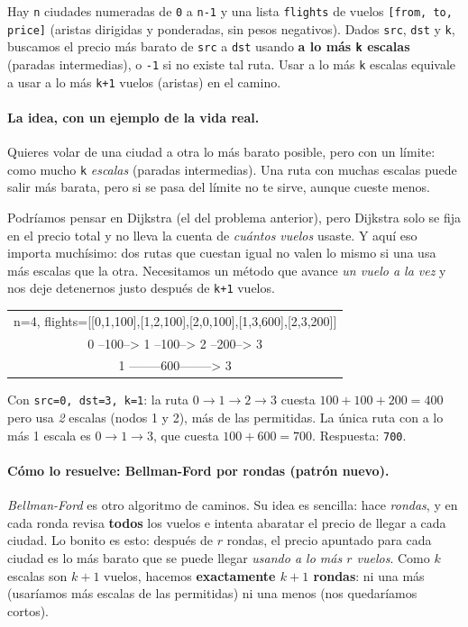 
Hay \texttt{n} ciudades numeradas de \texttt{0} a \texttt{n-1} y una lista
\texttt{flights} de vuelos \texttt{[from, to, price]} (aristas dirigidas y
ponderadas, sin pesos negativos). Dados \texttt{src}, \texttt{dst} y
\texttt{k}, buscamos el precio más barato de \texttt{src} a \texttt{dst}
usando \textbf{a lo más \texttt{k} escalas} (paradas intermedias), o
\texttt{-1} si no existe tal ruta. Usar a lo más \texttt{k} escalas equivale
a usar a lo más \texttt{k+1} vuelos (aristas) en el camino.

\paragraph{La idea, con un ejemplo de la vida real.} Quieres volar de una
ciudad a otra lo más barato posible, pero con un límite: como mucho
\texttt{k} \emph{escalas} (paradas intermedias). Una ruta con muchas escalas
puede salir más barata, pero si se pasa del límite no te sirve, aunque cueste
menos.

Podríamos pensar en Dijkstra (el del problema anterior), pero Dijkstra solo
se fija en el precio total y no lleva la cuenta de \emph{cuántos vuelos}
usaste. Y aquí eso importa muchísimo: dos rutas que cuestan igual no valen lo
mismo si una usa más escalas que la otra. Necesitamos un método que avance
\emph{un vuelo a la vez} y nos deje detenernos justo después de \texttt{k+1}
vuelos.

\begin{center}
\ttfamily
\begin{tabular}{c}
n=4, flights=[[0,1,100],[1,2,100],[2,0,100],[1,3,600],[2,3,200]]\\[6pt]
0 --100--> 1 --100--> 2 --200--> 3\\
\phantom{0 --100--> }1 --------600--------> 3
\end{tabular}
\end{center}

Con \texttt{src=0, dst=3, k=1}: la ruta $0\to1\to2\to3$ cuesta
$100+100+200=400$ pero usa \emph{2} escalas (nodos 1 y 2), más de las
permitidas. La única ruta con a lo más 1 escala es $0\to1\to3$, que cuesta
$100+600=700$. Respuesta: \texttt{700}.

\paragraph{Cómo lo resuelve: Bellman-Ford por rondas (patrón nuevo).}
\emph{Bellman-Ford} es otro algoritmo de caminos. Su idea es sencilla: hace
\emph{rondas}, y en cada ronda revisa \textbf{todos} los vuelos e intenta
abaratar el precio de llegar a cada ciudad. Lo bonito es esto: después de $r$
rondas, el precio apuntado para cada ciudad es lo más barato que se puede
llegar \emph{usando a lo más $r$ vuelos}. Como $k$ escalas son $k+1$ vuelos,
hacemos \textbf{exactamente $k+1$ rondas}: ni una más (usaríamos más escalas
de las permitidas) ni una menos (nos quedaríamos cortos).

